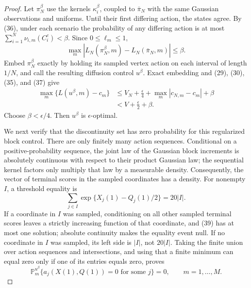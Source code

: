 \documentclass{article}
\begin{document}
\begin{proof}
Let \(\pi_N^\beta\) use the kernels \(\kappa_i^\beta\), coupled to \(\bar\pi_N\) with the same Gaussian observations and uniforms.  Until their first differing action, the states agree.  By (36), under each scenario the probability of any differing action is at most \(\sum_{i=1}^N\nu_{i,m}(C_i^c)<\beta\).  Since \(0\leq\ell_m\leq1\),
\[
 \max_m|L_N(\pi_N^\beta,m)-L_N(\bar\pi_N,m)|\leq\beta.          \tag{37}
\]
Embed \(\pi_N^\beta\) exactly by holding its sampled vertex action on each interval of length \(1/N\), and call the resulting diffusion control \(u^\beta\).  Exact embedding and (29), (30), (35), and (37) give
\[
 \begin{aligned}
 \max_m\{L(u^\beta,m)-c_m\}
 &\leq V_N+\frac\epsilon4+\max_m|c_{N,m}-c_m|+\beta\\
 &<V+\frac\epsilon2+\beta.                                     \tag{38}
 \end{aligned}
\]
Choose \(\beta<\epsilon/4\).  Then \(u^\beta\) is \(\epsilon\)-optimal.

We next verify that the discontinuity set has zero probability for this regularized block control.  There are only finitely many action sequences.  Conditional on a positive-probability sequence, the joint law of the Gaussian block increments is absolutely continuous with respect to their product Gaussian law; the sequential kernel factors only multiply that law by a measurable density.  Consequently, the vector of terminal scores in the sampled coordinates has a density.  For nonempty \(I\), a threshold equality is
\[
 \sum_{j\in I}\exp\{X_j(1)-Q_j(1)/2\}=20|I|.                   \tag{39}
\]
If a coordinate in \(I\) was sampled, conditioning on all other sampled terminal scores leaves a strictly increasing function of that coordinate, and (39) has at most one solution; absolute continuity makes the equality event null.  If no coordinate in \(I\) was sampled, its left side is \(|I|\), not \(20|I|\).  Taking the finite union over action sequences and intersections, and using that a finite minimum can equal zero only if one of its entries equals zero, proves
\[
 \mathbb P_m^{u^\beta}\{a_j(X(1),Q(1))=0
 \text{ for some }j\}=0,
 \qquad m=1,\ldots,M.                                           \tag{40}
\]


\end{proof}
\end{document}
